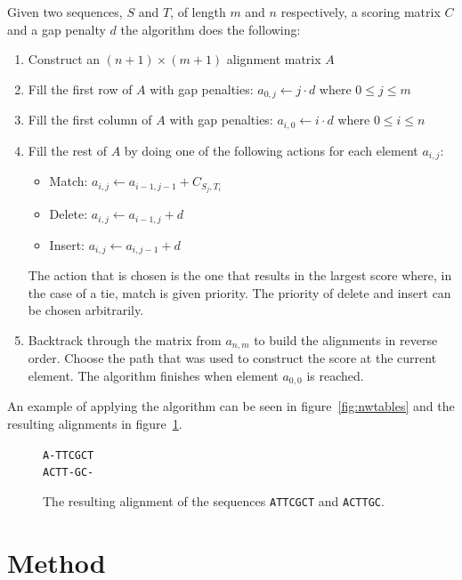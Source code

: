 \documentclass[a4paper]{report}
\begin{document}
Given two sequences, $S$ and $T$, of length $m$ and $n$ respectively, a scoring
matrix $C$ and a gap penalty $d$ the algorithm does the following:

\begin{enumerate}
    \item Construct an $(n + 1) \times (m + 1)$ alignment matrix $A$
    \item Fill the first row of $A$ with gap penalties: $a_{0,j} \gets j \cdot
        d$ where $0 \le j \le m$
    \item Fill the first column of $A$ with gap penalties: $a_{i,0} \gets i
        \cdot d$ where $0 \le i \le n$
    \item Fill the rest of $A$ by doing one of the following actions for each
        element $a_{i,j}$:
        \begin{itemize}
            \item Match: $a_{i,j} \gets a_{i - 1, j - 1} + C_{S_j,T_i}$
            \item Delete: $a_{i,j} \gets a_{i - 1, j} + d$
            \item Insert: $a_{i,j} \gets a_{i, j - 1} + d$
        \end{itemize}
        The action that is chosen is the one that results in the largest score
        where, in the case of a tie, match is given priority. The priority of
        delete and insert can be chosen arbitrarily.
    \item Backtrack through the matrix from $a_{n,m}$ to build the alignments
        in reverse order. Choose the path that was used to construct the score
        at the current element. The algorithm finishes when element $a_{0,0}$
        is reached.
\end{enumerate}

An example of applying the algorithm can be seen in figure~\ref{fig:nwtables}
and the resulting alignments in figure~\ref{fig:align}.

\begin{figure}[h]
    \centering
    \texttt{A-TTCGCT\\ACTT-GC-}
    \captionsetup{width=0.8\textwidth}
    \caption{The resulting alignment of the sequences \texttt{ATTCGCT} and
    \texttt{ACTTGC}.}
    \label{fig:align}
\end{figure}

\chapter{Method}
\end{document}

